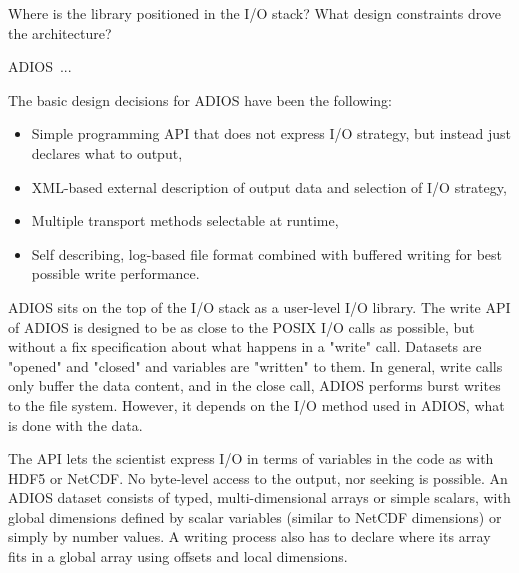 {\color {red}Where is the library positioned in the I/O stack? What design constraints drove the architecture?}

ADIOS~\cite{ADIOS:Lofstead:ipdps09}...

The basic design decisions for ADIOS have been the following:
\begin{itemize}
\item Simple programming API that does not express I/O strategy, but instead just declares what to output,
\item XML-based external description of output data and selection of I/O
strategy,
\item Multiple transport methods selectable at runtime,
\item Self describing, log-based file format combined with buffered writing for best possible write performance.
\end{itemize}

ADIOS sits on the top of the I/O stack as a user-level I/O library. The write API of ADIOS is designed to be as close to the POSIX I/O calls as possible, but without a fix specification about what happens in a "write" call. Datasets are "opened" and "closed" and variables are "written" to them. In general, write calls only buffer the data content, and in the close call, ADIOS performs burst writes to the file system. However, it depends on the I/O method used in ADIOS, what is done with the data.

The API lets the scientist express I/O in terms of variables in the code as with HDF5 or NetCDF. No byte-level access to the output, nor seeking is possible. An ADIOS dataset consists of typed, multi-dimensional arrays or simple scalars, with global dimensions defined by scalar variables (similar to NetCDF dimensions) or simply by number values. A writing process also has to declare where its array fits in a global array using offsets and local dimensions. 

